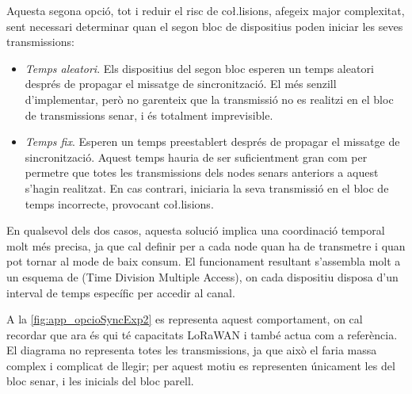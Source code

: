 \documentclass{tfgitic}[2024/07/01]
\begin{document}
{Aquesta segona opció, tot i reduir el risc de co\l.lisions, afegeix major complexitat, sent necessari determinar quan el segon bloc de dispositius poden iniciar les seves transmissions:
\begin{itemize}
    \item \emph{Temps aleatori}. Els dispositius del segon bloc esperen un temps aleatori després de propagar el missatge de sincronització. El més senzill d'implementar, però no garenteix que la transmissió no es realitzi en el bloc de transmissions senar, i és totalment imprevisible.
    \item \emph{Temps fix}. Esperen un temps preestablert després de propagar el missatge de sincronització. Aquest temps hauria de ser suficientment gran com per permetre que totes les transmissions dels nodes senars anteriors a aquest s'hagin realitzat. En cas contrari, iniciaria la seva transmissió en el bloc de temps incorrecte, provocant co\l.lisions.
\end{itemize}


En qualsevol dels dos casos, aquesta solució implica una coordinació temporal molt més precisa, ja que cal definir per a cada node quan ha de transmetre i quan pot tornar al mode de baix consum. El funcionament resultant s'assembla molt a un esquema de  (Time Division Multiple Access), on cada dispositiu disposa d'un interval de temps específic per accedir al canal.

A la \autoref{fig:app_opcioSyncExp2} es representa aquest comportament, on cal recordar que  ara és qui té capacitats LoRaWAN i també actua com a referència. El diagrama no representa totes les transmissions, ja que això el faria massa complex i complicat de llegir; per aquest motiu es representen únicament les del bloc senar, i les inicials del bloc parell.

}
\end{document}
